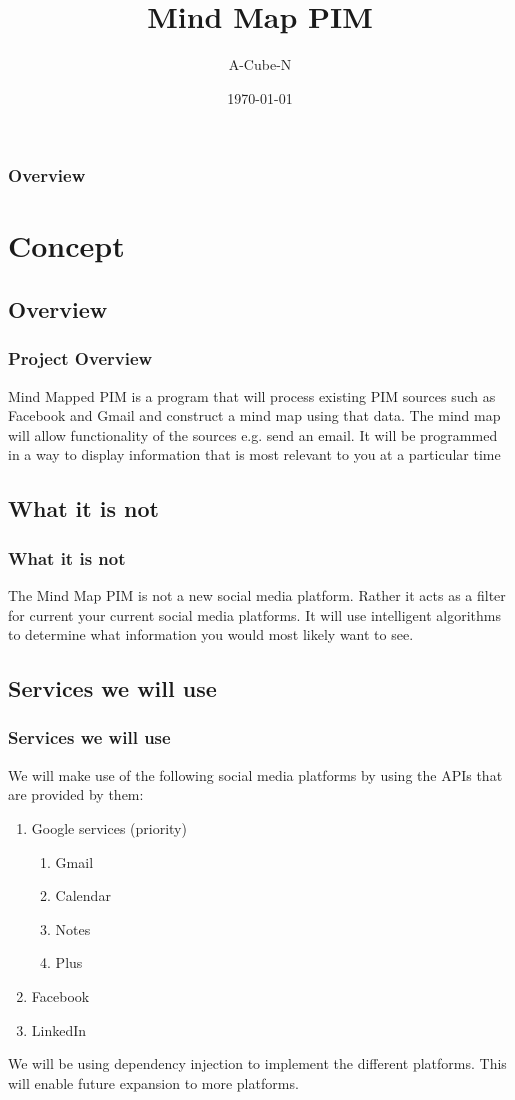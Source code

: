 \documentclass{beamer}
\title[Mind Map PIM]{Mind Map PIM}
\author{A-Cube-N}
\institute[UP]{
	Department of Computer Science, University of Pretoria
}
\date{\today}
\begin{document}
\begin{frame}
	\titlepage
\end{frame}

\begin{frame}
	\frametitle{Overview}
	\tableofcontents
\end{frame}

\section{Concept}
	\subsection{Overview}
		\begin{frame}
		\frametitle{Project Overview}
			Mind Mapped PIM is a program that will process existing PIM sources such as Facebook and Gmail and construct a mind map using that data. 
			The mind map will allow functionality of the sources e.g. send an email. It will be programmed in a way to display information that is most relevant to you at a particular time
		\end{frame}
	
	\subsection{What it is not}
		\begin{frame}
		\frametitle{What it is not}
			The Mind Map PIM is not a new social media platform. Rather it acts as a filter for current your current social media platforms.  It will use intelligent algorithms to determine what information you would most likely want to see.
		\end{frame}
			
	\subsection{Services we will use}
		\begin{frame}
		\frametitle{Services we will use}
			We will make use of the following social media platforms by using the APIs that are provided by them:
			\begin{enumerate}
				\item Google services (priority)
					\begin{enumerate}
						\item Gmail
						\item Calendar
						\item Notes
						\item Plus
					\end{enumerate}
				\item Facebook
				\item LinkedIn
			\end{enumerate}
			We will be using dependency injection to implement the different platforms. This will enable future expansion to more platforms.
		\end{frame}
		
\end{document}
